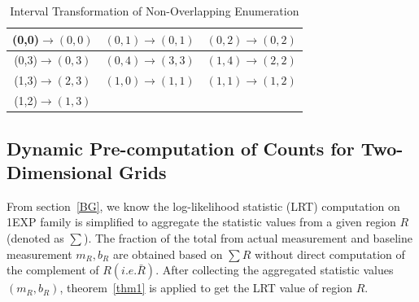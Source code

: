 \documentclass[AMA,LATO1COL]{WileyNJD-v2}
\begin{document}
\begin{table}[!ht]
  \centering
  \caption{Example: PU assignment  }\label{exampletable}

\end{table}

\begin{table}[t]
\centering \caption{Interval Transformation of Non-Overlapping Enumeration\label{tab:op}}
     \begin{tabular}{|c|c|c|}
	\hline
    (0,0)$\rightarrow (0,0)$  &  $(0,1) \rightarrow (0,1)$&  $(0,2) \rightarrow (0,2)$ \\
    \hline
    (0,3)$\rightarrow (0,3)$  &  $(0,4) \rightarrow (3,3)$&  $(1,4) \rightarrow (2,2)$ \\
    \hline
    (1,3)$\rightarrow (2,3)$  &  $(1,0) \rightarrow (1,1)$&  $(1,1) \rightarrow (1,2)$ \\
    \hline
     (1,2)$\rightarrow (1,3)$  &    &  \\
    \hline
\end{tabular}
\label{ex-nonoverlap}
\end{table}

\subsection{Dynamic Pre-computation of Counts for Two-Dimensional Grids}
\label{sec:mov2}
From section~\ref{BG}, we know the log-likelihood statistic (LRT) computation on 1EXP family is simplified to aggregate the statistic values from a given region $R$ (denoted as $\sum $). The fraction of the total from actual measurement and baseline measurement $m_R,b_R$ are obtained based on $\sum R$ without direct computation of the complement of $R (i.e. \bar R)$. After collecting the aggregated statistic values $(m_R,b_R)$, theorem~\ref{thm1} is applied to get the LRT value of region $R$.
\end{document}

